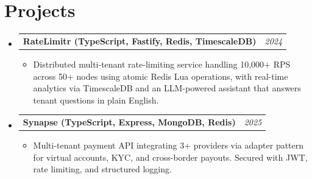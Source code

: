 \documentclass[a4paper, 20pt]{article}
\makeatletter
\newcommand{\resumeItem}[2]{ \item\small{ \textbf{#1}{: #2} } }
\newcommand{\resumeProjectHeading}[2]{ %
\vspace{2pt}
\item[]
\begin{tabular*}{0.97\textwidth}{l@{\extracolsep{\fill}}r}
	\textbf{#1} & \textit{#2} \\
\end{tabular*}
\vspace{0pt}
}
\newcommand{\resumeSubItem}[2]{\resumeItem{#1}{#2}
\vspace{-8pt}}
\newcommand{\resumeSubHeadingListStart}{\begin{itemize}[leftmargin=*,topsep=1pt]}
\newcommand{\resumeSubHeadingListEnd}{\end{itemize}}
\newcommand{\resumeItemListStart}{\begin{itemize}[topsep=0pt,itemsep=0pt,parsep=0pt]}
\newcommand{\resumeItemListEnd}{\end{itemize}}
\makeatother
\begin{document}
	\section{Projects}
	\resumeSubHeadingListStart \resumeProjectHeading{RateLimitr (TypeScript, Fastify, Redis, TimescaleDB)}{2024}
	\resumeItemListStart \item\small{Distributed multi-tenant rate-limiting service handling 10,000+ RPS across 50+ nodes using atomic Redis Lua operations, with real-time analytics via TimescaleDB and an LLM-powered assistant that answers tenant questions in plain English.}
	\resumeItemListEnd \resumeProjectHeading{Synapse (TypeScript, Express, MongoDB, Redis)}{2025}
	\resumeItemListStart \item\small{Multi-tenant payment API integrating 3+ providers via adapter pattern for virtual accounts, KYC, and cross-border payouts. Secured with JWT, rate limiting, and structured logging.}
	\resumeItemListEnd \resumeSubHeadingListEnd
\end{document}
